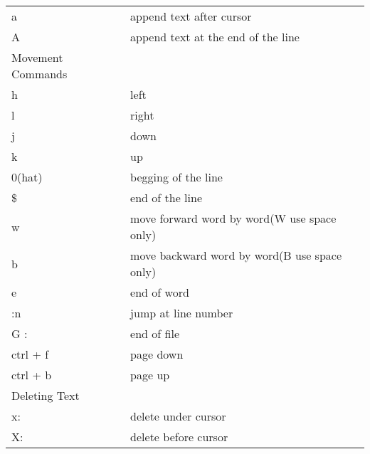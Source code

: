 \documentclass{article}
\begin{document}
\begin{longtable}{ll}
			a                                           & append text after cursor                          \\
			A                                           & append text at the end of the line                \\ \hline
			Movement Commands                           &                                                   \\ \hline
			h                                           & left                                              \\
			l                                           & right                                             \\
			j                                           & down                                              \\
			k                                           & up                                                \\
			0(hat)                                      & begging of the line                               \\
			\$                                          & end of the line                                   \\
			w                                           & move forward word by word(W use space only)       \\
			b                                           & move backward word by word(B use space only)      \\
			e                                           & end of word                                       \\
			:n                                          & jump at line number                               \\
			G :                                         & end of file                                       \\
			ctrl + f                                    & page down                                         \\
			ctrl + b                                    & page up                                           \\ \hline
			Deleting Text                               &                                                   \\ \hline
			x:                                          & delete under cursor                               \\
			X:                                          & delete before cursor                              \\

\end{longtable}
\end{document}
